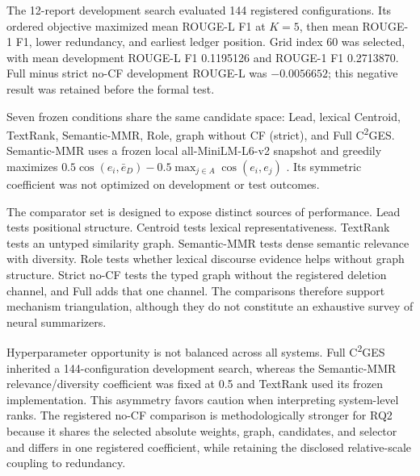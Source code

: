 \documentclass[applsci,article,submit,moreauthors]{Definitions/mdpi}
\newcommand{\cges}{C\textsuperscript{2}GES}
\begin{document}
The 12-report development search evaluated 144 registered configurations. Its ordered objective maximized mean ROUGE-L F1 at $K=5$, then mean ROUGE-1 F1, lower redundancy, and earliest ledger position. Grid index 60 was selected, with mean development ROUGE-L F1 0.1195126 and ROUGE-1 F1 0.2713870. Full minus strict no-CF development ROUGE-L was $-0.0056652$; this negative result was retained before the formal test.

Seven frozen conditions share the same candidate space: Lead, lexical Centroid, TextRank, Semantic-MMR, Role, graph without CF (strict), and Full \cges{}. Semantic-MMR uses a frozen local all-MiniLM-L6-v2 snapshot and greedily maximizes $0.5\cos(e_i,\bar e_D)-0.5\max_{j\in A}\cos(e_i,e_j)$ \cite{reimers2019sentencebert}. Its symmetric coefficient was not optimized on development or test outcomes.

The comparator set is designed to expose distinct sources of performance. Lead tests positional structure. Centroid tests lexical representativeness. TextRank tests an untyped similarity graph. Semantic-MMR tests dense semantic relevance with diversity. Role tests whether lexical discourse evidence helps without graph structure. Strict no-CF tests the typed graph without the registered deletion channel, and Full adds that one channel. The comparisons therefore support mechanism triangulation, although they do not constitute an exhaustive survey of neural summarizers.

Hyperparameter opportunity is not balanced across all systems. Full \cges{} inherited a 144-configuration development search, whereas the Semantic-MMR relevance/diversity coefficient was fixed at 0.5 and TextRank used its frozen implementation. This asymmetry favors caution when interpreting system-level ranks. The registered no-CF comparison is methodologically stronger for RQ2 because it shares the selected absolute weights, graph, candidates, and selector and differs in one registered coefficient, while retaining the disclosed relative-scale coupling to redundancy.
\end{document}
